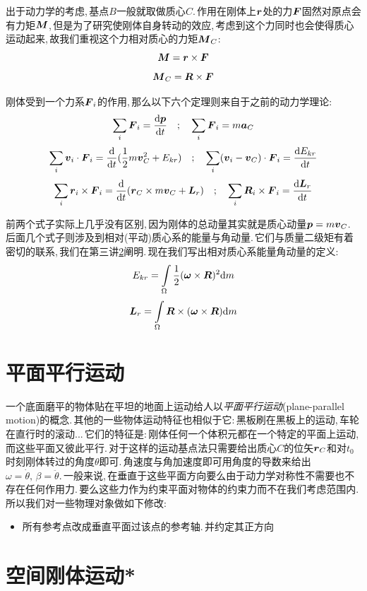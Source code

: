出于动力学的考虑,\,基点$B$一般就取做质心$C$.\,作用在刚体上$\boldsymbol{r}$处的力$\boldsymbol{F}$固然对原点会有力矩$\boldsymbol{M}$,\,但是为了研究使刚体自身转动的效应,\,考虑到这个力同时也会使得质心运动起来,\,故我们重视这个力相对质心的力矩$\boldsymbol{M}_C$:
\[\boldsymbol{M}=\boldsymbol{r}\times\boldsymbol{F}\]
\[\boldsymbol{M}_C=\boldsymbol{R}\times\boldsymbol{F}\]

刚体受到一个力系${\boldsymbol{F}_i}$的作用,\,那么以下六个定理则来自于之前的动力学理论:
\[\sum_i\boldsymbol{F}_i=\frac{\textrm{d} \boldsymbol{p}}{\textrm{d} t}\quad ; \quad \sum_i\boldsymbol{F}_i=m\boldsymbol{a}_C\]
\[\sum_i \boldsymbol{v}_i\cdot \boldsymbol{F}_i=\frac{\textrm{d} }{\textrm{d} t}(\frac{1}{2}m\boldsymbol{v}_C^2+E_{kr})\quad ;\quad \sum_i(\boldsymbol{v}_i-\boldsymbol{v}_C)\cdot \boldsymbol{F}_i=\frac{\textrm{d} E_{kr}}{\textrm{d} t}\]
\[\sum_i \boldsymbol{r}_i\times \boldsymbol{F}_i=\frac{\textrm{d} }{\textrm{d} t}(\boldsymbol{r}_C\times m\boldsymbol{v}_C+\boldsymbol{L}_r)\quad ;\quad \sum_i \boldsymbol{R}_i\times \boldsymbol{F}_i=\frac{\textrm{d} \boldsymbol{L}_r}{\textrm{d} t}\]

前两个式子实际上几乎没有区别,\,因为刚体的总动量其实就是质心动量$\boldsymbol{p}=m\boldsymbol{v}_C$.\,后面几个式子则涉及到相对(平动)质心系的能量与角动量.\,它们与质量二级矩有着密切的联系,\,我们在第三讲\ref{6.3}阐明.\,现在我们写出相对质心系能量角动量的定义:
\[E_{kr}=\int\limits_\Omega \frac{1}{2}(\boldsymbol{\omega}\times \boldsymbol{R})^2\textrm{d} m\]
\[\boldsymbol{L}_r=\int\limits_\Omega \boldsymbol{R}\times(\boldsymbol{\omega}\times \boldsymbol{R})\textrm{d} m\]




\section{平面平行运动}
一个底面磨平的物体贴在平坦的地面上运动给人以\emph{平面平行运动}(plane-parallel motion)的概念.\,其他的一些物体运动特征也相似于它:\,黑板刷在黑板上的运动,\,车轮在直行时的滚动...\,它们的特征是:\,刚体任何一个体积元都在一个特定的平面上运动,\,而这些平面又彼此平行.\,对于这样的运动基点法只需要给出质心$C$的位矢$\boldsymbol{r}_C$和对$t_0$时刻刚体转过的角度$\theta$即可.\,角速度与角加速度即可用角度的导数来给出$\omega=\dot{\theta},\,\beta=\ddot{\theta}$.\,一般来说,\,在垂直于这些平面方向要么由于动力学对称性不需要也不存在任何作用力.\,要么这些力作为约束平面对物体的约束力而不在我们考虑范围内.\,所以我们对一些物理对象做如下修改:\,
\begin{itemize}
\item 所有参考点改成垂直平面过该点的参考轴.\,并约定其正方向
\end{itemize}
\section{空间刚体运动*}\label{6.3}


